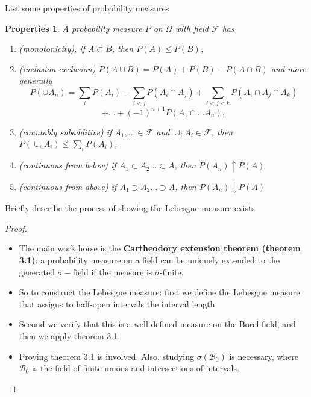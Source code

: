\documentclass[avery5388,grid,frame]{flashcards}
\newcommand{\sigf}{\sigma-\text{field}}
\newcommand{\F}{\mathcal F}
\newtheorem*{properties}{Properties}
\begin{document}
\begin{flashcard}
    {List some properties of probability measures}
    \begin{properties}
        A probability measure $P$ on $\Omega$ with field $\F$ has
        \begin{enumerate}
            \item (monotonicity), if $A \subset B$, then $P(A) \leq P(B)$,
            \item (inclusion-exclusion) $P(A \cup B) = P(A) + P(B) - P(A \cap B)$ and more generally
            $$P(\cup A_n) = \sum_i P(A_i) - \sum_{i < j} P(A_i \cap A_j) + \sum_{i < j < k} P(A_i \cap A_j \cap A_k)$$
            $$+ \dots + (-1)^{n+1} P(A_1 \cap \dots A_n),$$
            \item (countably subadditive) if $A_1, \dots \in \F$ and $\cup_i A_i \in \F$, then $P(\cup_i A_i) \leq \sum_i P(A_i)$,
            \item (continuous from below) if $A_1 \subset A_2 \dots \subset A$, then $P(A_n) \uparrow P(A)$
            \item (continuous from above) if $A_1 \supset A_2 \dots \supset A$, then $P(A_n) \downarrow P(A)$
        \end{enumerate}
    \end{properties}
\end{flashcard}


\begin{flashcard}
    {Briefly describe the process of showing the Lebesgue measure exists}
    \begin{proof}
        \begin{itemize}
            \item The main work horse is the \textbf{Cartheodory extension theorem (theorem 3.1)}: a probability measure on a field can be uniquely extended to the generated $\sigf$ if the measure is $\sigma$-finite.
            \item So to construct the Lebesgue measure: first we define the Lebesgue measure that assigns to half-open intervals the interval length.
            \item Second we verify that this is a well-defined measure on the Borel field, and then we apply theorem 3.1.
            \item Proving theorem 3.1 is involved. Also, studying $\sigma(\mathcal B_0)$ is necessary, where $\mathcal B_0$ is the field of finite unions and intersections of intervals.
        \end{itemize}
    \end{proof}
\end{flashcard}
\end{document}

